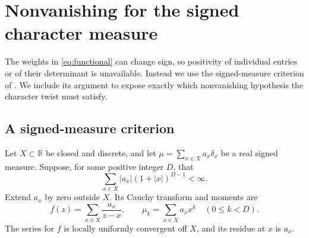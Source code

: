 \documentclass[11pt]{article}
\theoremstyle{remark}
\newcommand{\R}{\mathbb R}
\numberwithin{equation}{section}
\begin{document}
\section{Nonvanishing for the signed character measure}\label{sec:nonvanishing}
The weights in \eqref{eq:functional} can change sign, so positivity of
individual entries or of their determinant is unavailable. Instead we use
the signed-measure criterion of \cite[Proposition~5.4]{FLSZ}. We include
its argument to expose exactly which nonvanishing hypothesis the character
twist must satisfy.

\subsection{A signed-measure criterion}
Let $X\subset\R$ be closed and discrete, and let $\mu=\sum_{x\in X}a_x\delta_x$
be a real signed measure. Suppose, for some positive integer $D$, that
\begin{equation}\label{eq:growth}
 \sum_{x\in X}|a_x|(1+|x|)^{D-1}<\infty.
\end{equation}
Extend $a_x$ by zero outside $X$. Its Cauchy transform and moments are
\[
 f(z)=\sum_{x\in X}\frac{a_x}{z-x},\qquad
 \mu_k=\sum_{x\in X}a_x x^k\quad(0\leq k<D).
\]
The series for $f$ is locally uniformly convergent off $X$, and its residue
at $x$ is $a_x$.
\end{document}
